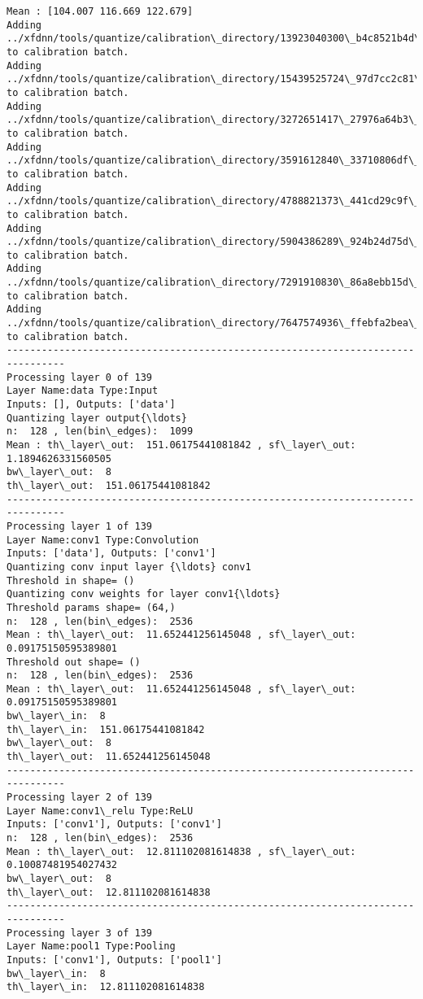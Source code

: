 \documentclass[11pt]{article}
\begin{document}
    \begin{Verbatim}[commandchars=\\\{\}]
Mean : [104.007 116.669 122.679]
Adding ../xfdnn/tools/quantize/calibration\_directory/13923040300\_b4c8521b4d\_z.jpg to calibration batch.
Adding ../xfdnn/tools/quantize/calibration\_directory/15439525724\_97d7cc2c81\_z.jpg to calibration batch.
Adding ../xfdnn/tools/quantize/calibration\_directory/3272651417\_27976a64b3\_z.jpg to calibration batch.
Adding ../xfdnn/tools/quantize/calibration\_directory/3591612840\_33710806df\_z.jpg to calibration batch.
Adding ../xfdnn/tools/quantize/calibration\_directory/4788821373\_441cd29c9f\_z.jpg to calibration batch.
Adding ../xfdnn/tools/quantize/calibration\_directory/5904386289\_924b24d75d\_z.jpg to calibration batch.
Adding ../xfdnn/tools/quantize/calibration\_directory/7291910830\_86a8ebb15d\_z.jpg to calibration batch.
Adding ../xfdnn/tools/quantize/calibration\_directory/7647574936\_ffebfa2bea\_z.jpg to calibration batch.
--------------------------------------------------------------------------------
Processing layer 0 of 139
Layer Name:data Type:Input
Inputs: [], Outputs: ['data']
Quantizing layer output{\ldots}
n:  128 , len(bin\_edges):  1099
Mean : th\_layer\_out:  151.06175441081842 , sf\_layer\_out:  1.1894626331560505
bw\_layer\_out:  8
th\_layer\_out:  151.06175441081842
--------------------------------------------------------------------------------
Processing layer 1 of 139
Layer Name:conv1 Type:Convolution
Inputs: ['data'], Outputs: ['conv1']
Quantizing conv input layer {\ldots} conv1
Threshold in shape= ()
Quantizing conv weights for layer conv1{\ldots}
Threshold params shape= (64,)
n:  128 , len(bin\_edges):  2536
Mean : th\_layer\_out:  11.652441256145048 , sf\_layer\_out:  0.09175150595389801
Threshold out shape= ()
n:  128 , len(bin\_edges):  2536
Mean : th\_layer\_out:  11.652441256145048 , sf\_layer\_out:  0.09175150595389801
bw\_layer\_in:  8
th\_layer\_in:  151.06175441081842
bw\_layer\_out:  8
th\_layer\_out:  11.652441256145048
--------------------------------------------------------------------------------
Processing layer 2 of 139
Layer Name:conv1\_relu Type:ReLU
Inputs: ['conv1'], Outputs: ['conv1']
n:  128 , len(bin\_edges):  2536
Mean : th\_layer\_out:  12.811102081614838 , sf\_layer\_out:  0.10087481954027432
bw\_layer\_out:  8
th\_layer\_out:  12.811102081614838
--------------------------------------------------------------------------------
Processing layer 3 of 139
Layer Name:pool1 Type:Pooling
Inputs: ['conv1'], Outputs: ['pool1']
bw\_layer\_in:  8
th\_layer\_in:  12.811102081614838

\end{Verbatim}
\end{document}
